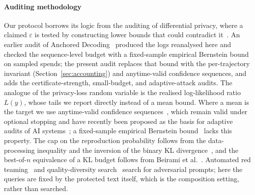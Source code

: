 \paragraph{Auditing methodology}
Our protocol borrows its logic from the auditing of differential privacy, where a claimed $\varepsilon$ is tested by constructing lower bounds that could contradict it~\cite{jagielski2020auditing,nasr2023tight,steinke2023privacy,annamalai2024nearly,kong2023dpauditorium,dwork2014algorithmic}. An earlier audit of Anchored Decoding~\cite{vijayavallabh2026audit} produced the logs reanalysed here and checked the sequence-level budget with a fixed-sample empirical Bernstein bound on sampled spends; the present audit replaces that bound with the per-trajectory invariant (Section~\ref{sec:accounting}) and anytime-valid confidence sequences, and adds the certificate-strength, small-budget, and adaptive-attack audits. The analogue of the privacy-loss random variable is the realised log-likelihood ratio $L(y)$, whose tails we report directly instead of a mean bound. Where a mean is the target we use anytime-valid confidence sequences~\cite{howard2021timeuniform,waudbysmith2024estimating,chugg2025closedform}, which remain valid under optional stopping and have recently been proposed as the basis for adaptive audits of AI systems~\cite{zhou2026adaptive}; a fixed-sample empirical Bernstein bound~\cite{maurer2009empirical,mnih2008empirical} lacks this property. The cap on the reproduction probability follows from the data-processing inequality and the inversion of the binary KL divergence~\cite{polyanskiy2024information,tsybakov2009introduction,bretagnolle1979estimation}, and the best-of-$n$ equivalence of a KL budget follows from Beirami et al.~\cite{beirami2025bestofn}. Automated red teaming~\cite{perez2022redteaming,ganguli2022redteaming} and quality-diversity search~\cite{mouret2015mapelites,samvelyan2024rainbow} search for adversarial prompts; here the queries are fixed by the protected text itself, which is the composition setting, rather than searched.
